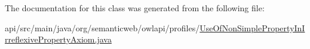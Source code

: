 The documentation for this class was generated from the following file\-:\begin{DoxyCompactItemize}
\item 
api/src/main/java/org/semanticweb/owlapi/profiles/\hyperlink{_use_of_non_simple_property_in_irreflexive_property_axiom_8java}{Use\-Of\-Non\-Simple\-Property\-In\-Irreflexive\-Property\-Axiom.\-java}\end{DoxyCompactItemize}
